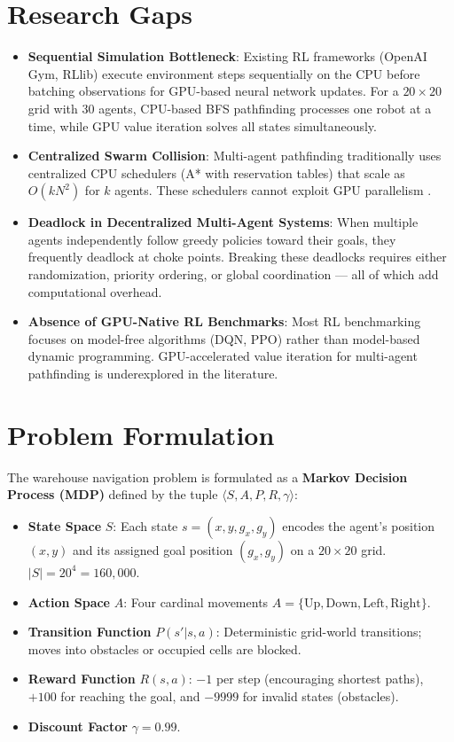 \documentclass[12pt,a4paper]{article}
\begin{document}
\section{Research Gaps}
\begin{itemize}
    \item \textbf{Sequential Simulation Bottleneck}: Existing RL frameworks (OpenAI Gym, RLlib) execute environment steps sequentially on the CPU before batching observations for GPU-based neural network updates. For a $20 \times 20$ grid with 30 agents, CPU-based BFS pathfinding processes one robot at a time, while GPU value iteration solves all states simultaneously.
    \item \textbf{Centralized Swarm Collision}: Multi-agent pathfinding traditionally uses centralized CPU schedulers (A* with reservation tables) that scale as $O(kN^2)$ for $k$ agents. These schedulers cannot exploit GPU parallelism \cite{ma2016lifelong}.
    \item \textbf{ Deadlock in Decentralized Multi-Agent Systems}: When multiple agents independently follow greedy policies toward their goals, they frequently deadlock at choke points. Breaking these deadlocks requires either randomization, priority ordering, or global coordination --- all of which add computational overhead.
    \item \textbf{Absence of GPU-Native RL Benchmarks}: Most RL benchmarking focuses on model-free algorithms (DQN, PPO) rather than model-based dynamic programming. GPU-accelerated value iteration for multi-agent pathfinding is underexplored in the literature.
\end{itemize}

\newpage
\section{Problem Formulation}

The warehouse navigation problem is formulated as a \textbf{Markov Decision Process (MDP)} defined by the tuple $\langle S, A, P, R, \gamma \rangle$:

\begin{itemize}
    \item \textbf{State Space} $S$: Each state $s = (x, y, g_x, g_y)$ encodes the agent's position $(x, y)$ and its assigned goal position $(g_x, g_y)$ on a $20 \times 20$ grid. $|S| = 20^4 = 160,000$.
    \item \textbf{Action Space} $A$: Four cardinal movements $A = \{\text{Up}, \text{Down}, \text{Left}, \text{Right}\}$.
    \item \textbf{Transition Function} $P(s'|s, a)$: Deterministic grid-world transitions; moves into obstacles or occupied cells are blocked.
    \item \textbf{Reward Function} $R(s,a)$: $-1$ per step (encouraging shortest paths), $+100$ for reaching the goal, and $-9999$ for invalid states (obstacles).
    \item \textbf{Discount Factor} $\gamma = 0.99$.
\end{itemize}
\end{document}
